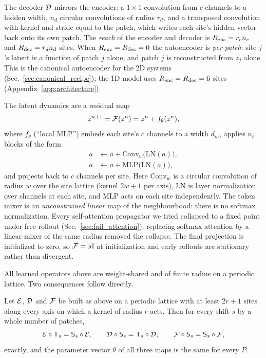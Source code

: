 The decoder $\mathcal{D}$ mirrors the encoder: a $1\times1$ convolution from
$c$ channels to a hidden width, $n_d$ circular convolutions of radius
$r_d$, and a transposed convolution with kernel and stride equal to the
patch, which writes each site's hidden vector back onto its own patch.
The \emph{reach} of the encoder and decoder is $R_{\mathrm{enc}} = r_e n_e$ and
$R_{\mathrm{dec}} = r_d n_d$ sites. When $R_{\mathrm{enc}}=R_{\mathrm{dec}}=0$ the autoencoder is
\emph{per-patch}: site $j$'s latent is a function of patch $j$ alone,
and patch $j$ is reconstructed from $z_j$ alone. This is the canonical
autoencoder for the 2D systems (Sec.~\ref{sec:canonical_recipe}); the 1D
model uses $R_{\mathrm{enc}}=R_{\mathrm{dec}}=6$ sites (Appendix~\ref{app:architecture}).

The latent dynamics are a residual map
\begin{equation}
  z^{n+1} = \mathcal{F}(z^{n}) = z^{n} + f_\theta(z^{n}),
  \label{eq:propagator}
\end{equation}
where $f_\theta$ (``local MLP'') embeds each site's $c$ channels to a
width $d_m$, applies $n_\ell$ blocks of the form
\begin{equation}
  \begin{aligned}
  a &\leftarrow a + \mathrm{Conv}_{w}\big(\mathrm{LN}(a)\big),\\
  a &\leftarrow a + \mathrm{MLP}\big(\mathrm{LN}(a)\big),
  \end{aligned}
  \label{eq:mixer_block}
\end{equation}
and projects back to $c$ channels per site. Here $\mathrm{Conv}_{w}$ is
a circular convolution of radius $w$ over the site lattice (kernel
$2w+1$ per axis), $\mathrm{LN}$ is layer normalization over channels at
each site, and $\mathrm{MLP}$ acts on each site independently. The token
mixer is an \emph{unconstrained linear} map of the neighbourhood: there
is no softmax normalization. Every self-attention propagator we tried
collapsed to a fixed point under free rollout (Sec.~\ref{sec:fail_attention});
replacing softmax attention by a linear mixer of the same radius removed
the collapse. The final projection is initialized to zero, so
$\mathcal{F}=\mathrm{id}$ at initialization and early rollouts are stationary
rather than divergent.

All learned operators above are weight-shared and of finite radius on a
periodic lattice. Two consequences follow directly.

\begin{proposition}
\label{prop:equivariance}
Let $\mathcal{E}$, $\mathcal{D}$ and $\mathcal{F}$ be built as above on a periodic lattice with at
least $2r+1$ sites along every axis on which a kernel of radius $r$ acts.
Then for every shift $s$ by a whole number of patches,
\begin{equation}
  \mathcal{E}\circ\mathsf{T}_{s} = \mathsf{S}_s\circ\mathcal{E}, \qquad
  \mathcal{D}\circ\mathsf{S}_s = \mathsf{T}_{s}\circ\mathcal{D}, \qquad
  \mathcal{F}\circ\mathsf{S}_s = \mathsf{S}_s\circ\mathcal{F},
  \label{eq:equivariance}
\end{equation}
exactly, and the parameter vector $\theta$ of all three maps is the same
for every $P$.
\end{proposition}

